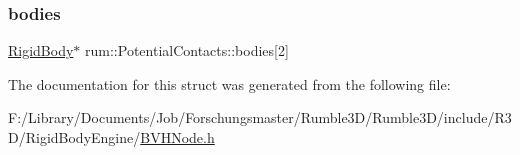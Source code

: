 \subsubsection{\texorpdfstring{bodies}{bodies}}
{\footnotesize\ttfamily \hyperlink{classrum_1_1_rigid_body}{Rigid\+Body}$\ast$ rum\+::\+Potential\+Contacts\+::bodies\mbox{[}2\mbox{]}}



The documentation for this struct was generated from the following file\+:\begin{DoxyCompactItemize}
\item 
F\+:/\+Library/\+Documents/\+Job/\+Forschungsmaster/\+Rumble3\+D/\+Rumble3\+D/include/\+R3\+D/\+Rigid\+Body\+Engine/\hyperlink{_b_v_h_node_8h}{B\+V\+H\+Node.\+h}\end{DoxyCompactItemize}
